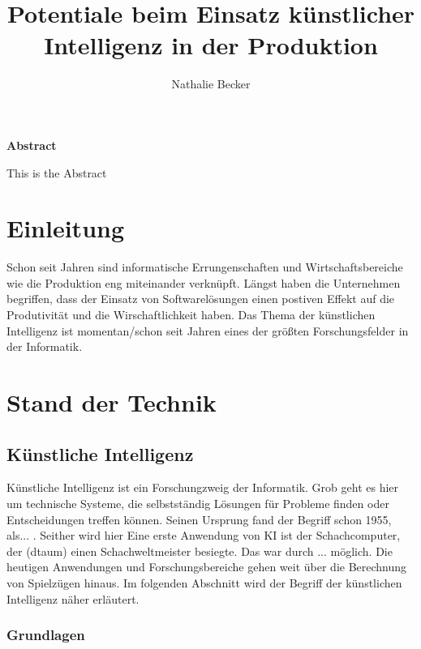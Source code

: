 \documentclass[a4paper,12pt, german]{report}
\begin{document}
\title{Potentiale beim Einsatz künstlicher Intelligenz in der Produktion}
\author{Nathalie Becker}


\begin{titlepage}
\maketitle
\end{titlepage}


\begin{center}
\textbf{Abstract}
\end{center}
This is the Abstract


\tableofcontents
\printacronyms

\chapter{Einleitung}

Schon seit Jahren sind informatische Errungenschaften und Wirtschaftsbereiche wie die Produktion eng miteinander verknüpft. Längst haben die Unternehmen begriffen, dass der Einsatz von Softwarelösungen einen postiven Effekt auf die Produtivität und die Wirschaftlichkeit haben.
Das Thema der künstlichen Intelligenz ist momentan/schon seit Jahren eines der größten Forschungsfelder in der Informatik. 


\chapter{Stand der Technik}

\section{Künstliche Intelligenz}

Künstliche Intelligenz ist ein Forschungzweig der Informatik. Grob geht es hier um technische Systeme, die selbstständig Lösungen für Probleme finden oder Entscheidungen treffen können.
Seinen Ursprung fand der Begriff schon 1955, als... . 
Seither wird hier  Eine erste Anwendung von KI ist der Schachcomputer, der (dtaum) einen Schachweltmeister besiegte. Das war durch ... möglich. 
Die heutigen Anwendungen und Forschungsbereiche gehen weit über die Berechnung von Spielzügen hinaus. 
Im folgenden Abschnitt wird der Begriff der künstlichen Intelligenz näher erläutert. \cite{01}


\subsection{Grundlagen}
\end{document}
